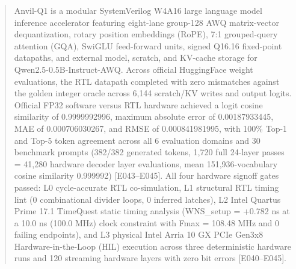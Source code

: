 \documentclass[11pt,a4paper]{article}
\begin{document}
\renewcommand{\abstractname}{\textcolor{vulcanblue}{Abstract}}\begin{abstract}\noindent Anvil-Q1 is a modular SystemVerilog W4A16 large language model inference accelerator featuring eight-lane group-128 AWQ matrix-vector dequantization,\allowbreak{} rotary position embeddings (\allowbreak{}RoPE)\allowbreak{},\allowbreak{} 7:1 grouped-query attention (\allowbreak{}GQA)\allowbreak{},\allowbreak{} SwiGLU feed-forward units,\allowbreak{} signed Q16.16 fixed-point datapaths,\allowbreak{} and external model,\allowbreak{} scratch,\allowbreak{} and KV-cache storage for Qwen2.5-0.5B-Instruct-AWQ. Across official HuggingFace weight evaluations,\allowbreak{} the RTL datapath completed with zero mismatches against the golden integer oracle across 6,\allowbreak{}144 scratch/\allowbreak{}KV writes and output logits. Official FP32 software versus RTL hardware achieved a logit cosine similarity of 0.9999992996,\allowbreak{} maximum absolute error of 0.00187933445,\allowbreak{} MAE of 0.000706030267,\allowbreak{} and RMSE of 0.000841981995,\allowbreak{} with 100\% Top-1 and Top-5 token agreement across all 6 evaluation domains and 30 benchmark prompts (\allowbreak{}382/\allowbreak{}382 generated tokens,\allowbreak{} 1,\allowbreak{}720 full 24-layer passes =\allowbreak{} 41,\allowbreak{}280 hardware decoder layer evaluations,\allowbreak{} mean 151,\allowbreak{}936-vocabulary cosine similarity 0.999992)\allowbreak{} [\allowbreak{}E043–E045]\allowbreak{}. All four hardware signoff gates passed: L0 cycle-accurate RTL co-simulation,\allowbreak{} L1 structural RTL timing lint (\allowbreak{}0 combinational divider loops,\allowbreak{} 0 inferred latches)\allowbreak{},\allowbreak{} L2 Intel Quartus Prime 17.1 TimeQuest static timing analysis (\allowbreak{}WNS\_\allowbreak{}setup =\allowbreak{} +\allowbreak{}0.782 ns at a 10.0 ns (\allowbreak{}100.0 MHz)\allowbreak{} clock constraint with Fmax =\allowbreak{} 108.48 MHz and 0 failing endpoints)\allowbreak{},\allowbreak{} and L3 physical Intel Arria 10 GX PCIe Gen3x8 Hardware-in-the-Loop (\allowbreak{}HIL)\allowbreak{} execution across three deterministic hardware runs and 120 streaming hardware layers with zero bit errors [\allowbreak{}E040–E045]\allowbreak{}.\par{}\end{abstract}\vspace{2pt}
\end{document}
